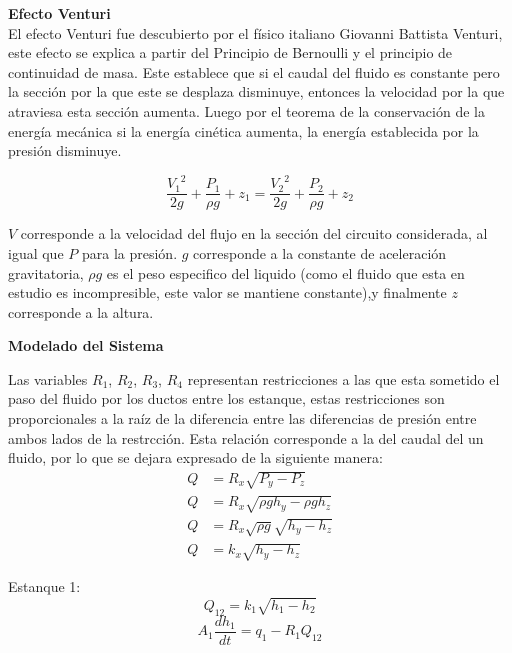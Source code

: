 \documentclass[11pt,letterpaper,spanish,notitlepage]{report}
\begin{document}
\textbf{Efecto Venturi}\\
\justify El efecto Venturi fue descubierto por el físico italiano Giovanni Battista Venturi, este efecto se explica a partir del Principio de Bernoulli y el principio de continuidad de masa. Este establece que si el caudal del fluido es constante pero la sección por la que este se desplaza disminuye, entonces la velocidad por la que atraviesa esta sección aumenta. Luego por el teorema de la conservación de la energía mecánica si la energía cinética aumenta, la energía establecida por la presión disminuye.

\begin{equation}
    \frac{{V_{1}}^2}{2g}+\frac{P_{1}}{\rho g}+z_{1} = \frac{{V_{2}}^2}{2g}+\frac{P_{2}}{\rho g}+z_{2}
\end{equation}

\justify \textbf{$V$} corresponde a la velocidad del flujo en la sección del circuito considerada, al igual que \textbf{$P$} para la presión. \textbf{$g$} corresponde a la constante de aceleración gravitatoria, \textbf{$\rho g$} es el peso especifico del liquido (como el fluido que esta en estudio es incompresible, este valor se mantiene constante),y finalmente \textbf{$z$} corresponde a la altura.

\newpage 


\textbf{Modelado del Sistema}

\justify Las variables $R_{1}$, $R_{2}$, $R_{3}$, $R_{4}$ representan restricciones a las que esta sometido el paso del fluido por los ductos entre los estanque, estas restricciones son proporcionales a la raíz de la diferencia entre las diferencias de presión entre ambos lados de la restrcción. Esta relación corresponde a la del caudal del un fluido, por lo que se dejara expresado de la siguiente manera:\\
\begin{align*}
    Q &= R_{x}\sqrt{P_{y}-P_{z}}\\
    Q &= R_{x}\sqrt{\rho gh_{y}-\rho gh_{z}}\\
    Q &= R_{x}\sqrt{\rho g}\sqrt{h_{y}-h_{z}}\\
     Q &= k_{x}\sqrt{h_{y}-h_{z}}
\end{align*}
    


\justify Estanque 1:\\
\begin{equation}
    Q_{12}=k_{1}\sqrt{h_{1}-h_{2}}
\end{equation}
\begin{equation}
    A_{1}\frac{dh_{1}}{dt} = q_{1}-R_{1}Q_{12}
\end{equation}
\end{document}
